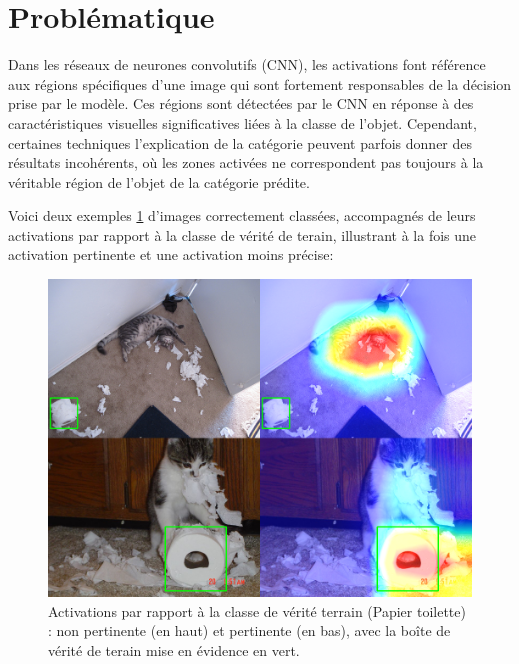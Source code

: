 \documentclass{report}
\begin{document}
{\section{Problématique}
\hspace{1.6cm}Dans les réseaux de neurones convolutifs (CNN), les activations font référence aux régions spécifiques d'une image qui sont fortement responsables de la décision prise par le modèle. Ces régions sont détectées par le CNN en réponse à des caractéristiques visuelles significatives liées à la classe de l'objet. Cependant, certaines techniques l'explication de la catégorie peuvent parfois donner des résultats incohérents, où les zones activées ne correspondent pas toujours à la véritable région de l'objet de la catégorie prédite. 

Voici deux exemples \ref{fig:Exemples d'Activation : Activation Pertinente et Non Pertinente} d'images correctement classées, accompagnés de leurs activations par rapport à la classe de vérité de terain, illustrant à la fois une activation pertinente et une activation moins précise:

\begin{figure}[htbp] 
	\centering
        \includegraphics[width=14.2cm]{logo/bad_&_good_CAM_ce.png.png} 
	\caption{Activations par rapport à la classe de vérité terrain (Papier toilette)  : non pertinente (en haut) et pertinente (en bas), avec la boîte de vérité de terain mise en évidence en vert.}
	\label{fig:Exemples d'Activation : Activation Pertinente et Non Pertinente}
\end{figure}
\newpage
\vspace*{0.1\baselineskip}

}
\end{document}
